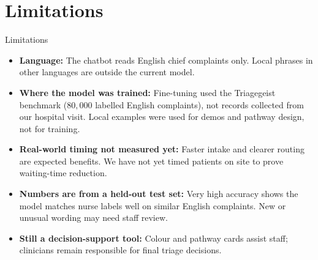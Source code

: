 \section{Limitations}

\begin{frame}{Limitations}
	\begin{itemize}
		\item \textbf{Language:} The chatbot reads English chief complaints only. Local phrases in other languages are outside the current model.
		\item \textbf{Where the model was trained:} Fine-tuning used the Triagegeist benchmark (\(80{,}000\) labelled English complaints), not records collected from our hospital visit. Local examples were used for demos and pathway design, not for training.
		\item \textbf{Real-world timing not measured yet:} Faster intake and clearer routing are expected benefits. We have not yet timed patients on site to prove waiting-time reduction.
		\item \textbf{Numbers are from a held-out test set:} Very high accuracy shows the model matches nurse labels well on similar English complaints. New or unusual wording may need staff review.
		\item \textbf{Still a decision-support tool:} Colour and pathway cards assist staff; clinicians remain responsible for final triage decisions.
	\end{itemize}
\end{frame}
